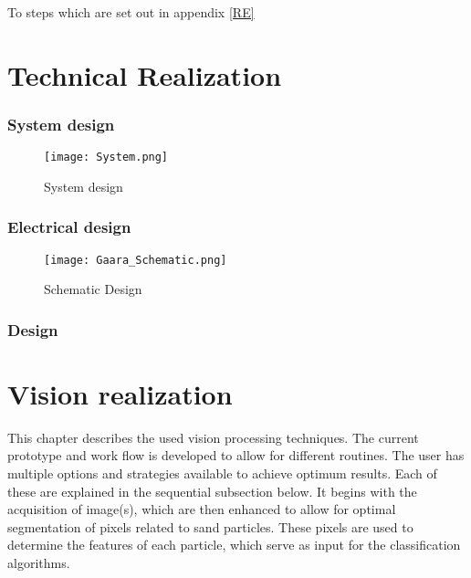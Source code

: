 \documentclass[11pt,fleqn,,a4paper,twoside,openright]{book}
\begin{document}
To steps which are set out in appendix \ref{RE}

\chapter{Technical Realization}

\subsection{System design}
\begin{figure}[h]
	\texttt{[image: System.png]}
	\caption{System design}\label{fig:Systemdesign}
\end{figure}

\subsection{Electrical design}

\begin{figure}[h]
	\texttt{[image: Gaara\_Schematic.png]}
	\caption{Schematic Design}\label{fig:Schematicdesign}
\end{figure}

\subsection{Design}

\chapter{Vision realization}
This chapter describes the used vision processing techniques. The current prototype and work flow is developed to allow for different routines. The user has multiple options and strategies available to achieve optimum results. Each of these are explained in the sequential subsection below. It begins with the acquisition of image(s), which are then enhanced to allow for optimal segmentation of pixels related to sand particles. These pixels are used to determine the features of each particle, which serve as input for the classification algorithms.
\end{document}
